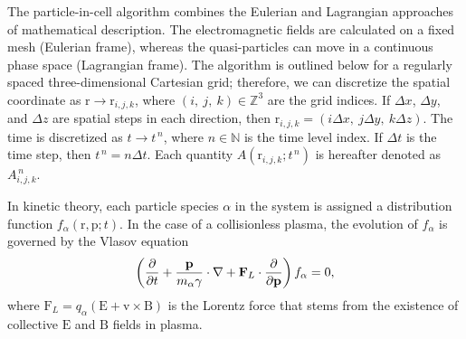 \documentclass[10pt, a4paper, twoside, openright]{report}
\renewcommand{\vec}[1]{\boldsymbol{\mathrm{#1}}}
\begin{document}
The particle-in-cell algorithm combines the Eulerian and Lagrangian approaches of mathematical description. The electromagnetic fields are calculated on a fixed mesh (Eulerian frame), whereas the quasi-particles can move in a continuous phase space (Lagrangian frame). The algorithm is outlined below for a regularly spaced three-dimensional Cartesian grid; therefore, we can discretize the spatial coordinate as $ \vec{r} \rightarrow \vec{r}_{i, j, k} $, where $ (i, \ j, \ k) \in \mathbb{Z}^{3} $ are the grid indices. If $ \Delta x $, $ \Delta y $, and $ \Delta z $ are spatial steps in each direction, then $ \vec{r}_{i, j, k} = \left( i \Delta x, \ j \Delta y, \ k \Delta z \right) $. The time is discretized as $ t \rightarrow t^{\,n} $, where $ n \in \mathbb{N} $ is the time level index. If $ \Delta t $ is the time step, then $ t^{\,n} = n \Delta t $. Each quantity $ A \left(\vec{r}_{i, j, k}; t^{\,n} \right) $ is hereafter denoted as $ A_{i, j, k}^{\,n} $.


In kinetic theory, each particle species $ \alpha $ in the system is assigned a distribution function $ f_{\alpha} \left( \vec{r}, \vec{p}; t \right) $. In the case of a collisionless plasma, the evolution of $ f_{\alpha} $ is governed by the Vlasov equation
\begin{equation}\label{eq:vlasov_eq}
	\left( \diffp[]{}{t} + \frac{\vec{p}}{m_{\alpha} \gamma} \cdot \nabla + \vec{F}_L \cdot \frac{\partial}{\partial \vec{p}} \right) f_{\alpha} = 0,
\end{equation}
where $ \vec{F}_L = q_{\alpha} \left( \vec{E} + \vec{v} \times \vec{B} \right) $ is the Lorentz force that stems from the existence of collective $ \vec{E} $ and $ \vec{B} $ fields in plasma.
\end{document}
